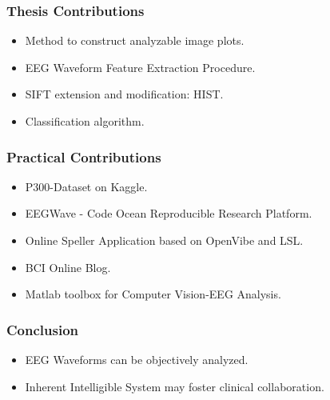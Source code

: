 \documentclass[aspectratio=169]{beamer}
\newcommand\Fontre{\fontsize{16}{16.2}\selectfont}
\begin{document}
\begin{frame}
\frametitle{Thesis Contributions}
\begin{center}
\begin{itemize}
\item \Fontre Method to construct analyzable image plots.
\item \Fontre EEG Waveform Feature Extraction Procedure.
\item \Fontre SIFT extension and modification: HIST.
\item \Fontre Classification algorithm.
\end{itemize}
\end{center}
\end{frame}        

\begin{frame}
\frametitle{Practical Contributions}
\begin{center}
\begin{itemize}
\item \Fontre P300-Dataset on Kaggle.
\item \Fontre EEGWave - Code Ocean Reproducible Research Platform.
\item \Fontre Online Speller Application based on OpenVibe and LSL.
\item \Fontre BCI Online Blog.
\item \Fontre Matlab toolbox for Computer Vision-EEG Analysis.
\end{itemize}
\end{center}
\end{frame} 
    
\begin{frame}
\frametitle{Conclusion}
\begin{center}
\begin{itemize}
\item \Fontre EEG Waveforms can be objectively analyzed.
\item \Fontre Inherent Intelligible System may foster clinical collaboration.
\end{itemize}
\end{center}
\end{frame}    
    
%
\end{document}
